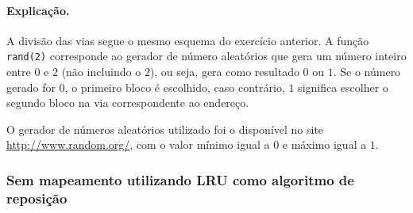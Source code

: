 \paragraph{Explicação.} A divisão das vias segue o mesmo esquema do
exercício anterior. A função {\tt rand(2)} corresponde ao gerador de
número aleatórios que gera um número inteiro entre $0$ e $2$ (não
incluindo o $2$), ou seja, gera como resultado $0$ ou $1$. Se o número
gerado for $0$, o primeiro bloco é escolhido, caso contrário, $1$
significa escolher o segundo bloco na via correspondente ao endereço.

O gerador de números aleatórios utilizado foi o disponível no site\\
\url{http://www.random.org/}, com o valor mínimo igual a $0$ e máximo
igual a $1$.

\newpage
\subsubsection*{Sem  mapeamento utilizando LRU como
  algoritmo de reposição}

\setcounter{themiss}{0}
\setcounter{thehit}{0}
\def\tdist{8cm}


